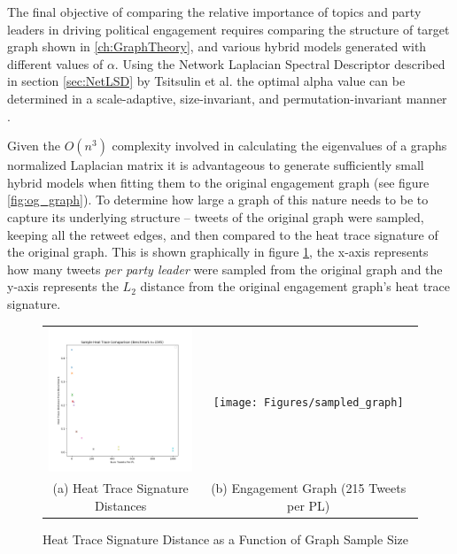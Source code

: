 The final objective of comparing the relative importance of topics and party
leaders in driving political engagement requires comparing the structure of
target graph shown in \ref{ch:GraphTheory}, and various hybrid models generated
with different values of $\alpha$. Using the Network Laplacian Spectral
Descriptor described in section \ref{sec:NetLSD} by Tsitsulin et al. the optimal
alpha value can be determined in a scale-adaptive, size-invariant, and
permutation-invariant manner \cite{netlsd}.

Given the $O(n^{3})$ complexity involved in calculating the eigenvalues of a
graphs normalized Laplacian matrix it is advantageous to generate sufficiently
small hybrid models when fitting them to the original engagement graph (see
figure \ref{fig:og_graph}). To determine how large a graph of this nature needs
to be to capture its underlying structure -- tweets of the original graph were
sampled, keeping all the retweet edges, and then compared to the heat trace
signature of the original graph. This is shown graphically in figure
\ref{fig:dist_from_original_graph_over_sample_size}, the x-axis represents how
many tweets \emph{per party leader} were sampled from the original graph and the
y-axis represents the $L_{2}$ distance from the original engagement graph's heat
trace signature. 

\begin{singlespacing}
    \begin{figure}[H]
    \centering
    \begin{tabular}{cc}
        \includegraphics[width=50mm]{Figures/dist_from_original_graph_over_sample_size} &
        \texttt{[image: Figures/sampled\_graph]} \\
        (a) Heat Trace Signature Distances & (b) Engagement Graph (215 Tweets per PL)\\[6pt]
    \end{tabular}
    \caption[Heat Trace Signature Distance as a Function of Graph Sample Size]{Heat Trace Signature Distance as a Function of Graph Sample Size}
    \label{fig:dist_from_original_graph_over_sample_size}
    \end{figure}
\end{singlespacing}

